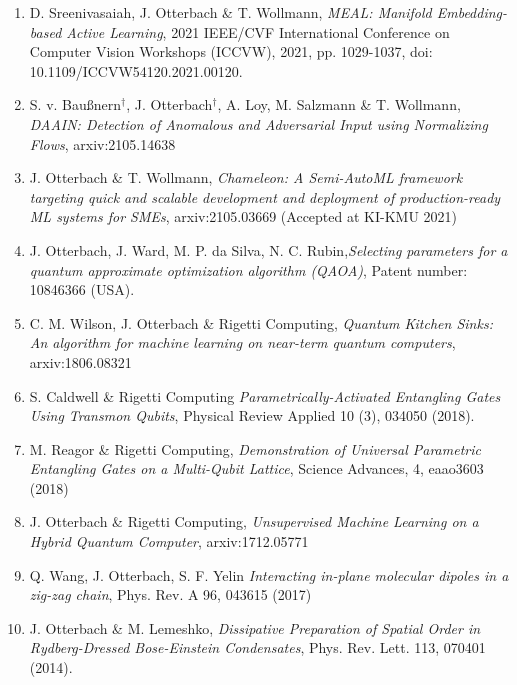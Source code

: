 \documentclass[10pt,centered]{./res} %
\begin{document}
\begin{resume}
\begin{enumerate}
  \item D. Sreenivasaiah, J. Otterbach \& T. Wollmann, \textit{MEAL: Manifold Embedding-based Active Learning}, 2021 IEEE/CVF International Conference on Computer Vision Workshops (ICCVW), 2021, pp. 1029-1037, doi: 10.1109/ICCVW54120.2021.00120.
  
  \item S. v. Baußnern$^\dagger$, J. Otterbach$^\dagger$, A. Loy, M. Salzmann \& T. Wollmann, \textit{DAAIN: Detection of Anomalous and Adversarial Input using Normalizing Flows}, arxiv:2105.14638
  
  \item J. Otterbach \& T. Wollmann, \textit{Chameleon: A Semi-AutoML framework targeting quick and scalable development and deployment of production-ready ML systems for SMEs}, arxiv:2105.03669 (Accepted at KI-KMU 2021)
  
  \item J. Otterbach, J. Ward, M. P. da Silva, N. C. Rubin,\textit{Selecting parameters for a quantum approximate optimization algorithm (QAOA)}, Patent number: 10846366 (USA).
  
  \item C. M. Wilson, J. Otterbach \& Rigetti Computing, \textit{Quantum Kitchen Sinks: An algorithm for machine learning on near-term quantum computers}, arxiv:1806.08321
  
  \item S. Caldwell \& Rigetti Computing \textit{Parametrically-Activated Entangling Gates Using Transmon Qubits}, Physical Review Applied 10 (3), 034050 (2018).

  \item M. Reagor \& Rigetti Computing, \textit{Demonstration of Universal Parametric Entangling Gates on a Multi-Qubit Lattice}, Science Advances, 4, eaao3603 (2018)
  
  \item J. Otterbach \& Rigetti Computing, \textit{Unsupervised Machine Learning on a Hybrid Quantum Computer}, arxiv:1712.05771
  
  \item Q. Wang, J. Otterbach, S. F. Yelin \textit{Interacting in-plane molecular dipoles in a zig-zag chain}, Phys. Rev. A 96, 043615 (2017)
  
  \item J. Otterbach \& M. Lemeshko, \textit{Dissipative Preparation of Spatial Order in Rydberg-Dressed Bose-Einstein Condensates}, Phys. Rev. Lett. 113, 070401 (2014).
  

\end{enumerate}
\end{resume}
\end{document}
